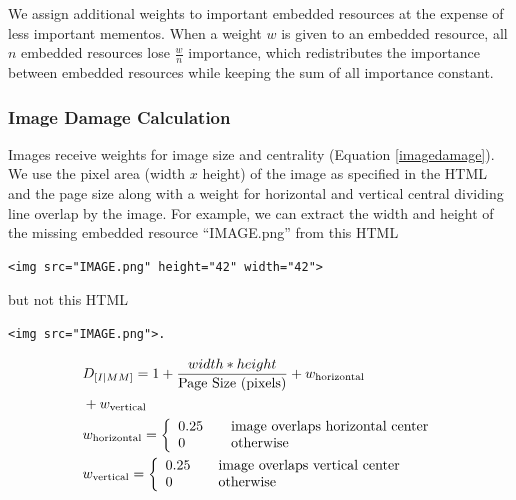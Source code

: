 We assign additional weights to important embedded resources at the expense of less important mementos. When a weight $w$ is given to an embedded resource, all $n$ embedded resources lose $\frac{w}{n}$ importance, which redistributes the importance between embedded resources while keeping the sum of all importance constant. 

\subsubsection{Image Damage Calculation}
Images receive weights for image size and centrality (Equation \ref{imagedamage}). We use the pixel area (width $x$ height) of the image as specified in the HTML and the page size along with a weight for horizontal and vertical central dividing line overlap by the image. For example, we can extract the width and height of the missing embedded resource ``IMAGE.png'' from this HTML

\begin{verbatim}
<img src="IMAGE.png" height="42" width="42">
\end{verbatim}

\noindent but not this HTML

\begin{verbatim}
<img src="IMAGE.png">.
\end{verbatim}

\begin{equation}
\label{imagedamage}
\begin{split}
&D_{[I|MM]} = 1 + \frac{width * height}{\text{Page Size (pixels)}} + w_{\text{horizontal}} \\&+ w_{\text{vertical}}\\
&w_{\text{horizontal}} =  \left\{
  \begin{array}{l l}
    0.25 & \quad \text{image overlaps horizontal center}\\
    0    & \quad \text{otherwise}
  \end{array} \right.\\
&w_{\text{vertical}} =  \left\{
  \begin{array}{l l}
    0.25 & \quad \text{image overlaps vertical center}\\
    0    & \quad \text{otherwise}
  \end{array} \right.
\end{split}
\end{equation}


